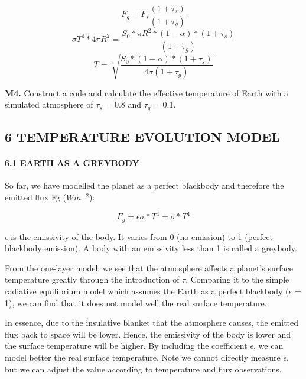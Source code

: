 \documentclass[
  letterpaper,
  DIV=11,
  numbers=noendperiod]{scrartcl}
\let\oldparagraph\paragraph
\renewcommand{\paragraph}[1]{\oldparagraph{#1}\mbox{}}
\begin{document}
\[F_g = F_s\frac{(1+\tau_s)}{(1+\tau_g)}\]
\[\sigma T^4 * 4\pi R^2 = \frac{S_0 * \pi R^2 * (1-\alpha)*(1+\tau_s)}{(1+\tau_g)}\]
\[T = \sqrt[4]{\frac{S_0 * (1-\alpha)*(1+\tau_s)}{4\sigma(1+\tau_g)}}\]

\begin{tcolorbox}[enhanced jigsaw, titlerule=0mm, title={Modelling Questions}, arc=.35mm, breakable, colback=white, toprule=.15mm, colframe=quarto-callout-caution-color-frame, opacityback=0, bottomtitle=1mm, coltitle=black, toptitle=1mm, rightrule=.15mm, colbacktitle=quarto-callout-caution-color!10!white, bottomrule=.15mm, opacitybacktitle=0.6, leftrule=.75mm, left=2mm]

\textbf{M4.} Construct a code and calculate the effective temperature of
Earth with a simulated atmosphere of \(\tau_s\) = 0.8 and \(\tau_g\) =
0.1.

\end{tcolorbox}

\hypertarget{temperature-evolution-model}{%
\subsection{6 \textbar{} TEMPERATURE EVOLUTION
MODEL}\label{temperature-evolution-model}}

\hypertarget{earth-as-a-greybody}{%
\paragraph{6.1 EARTH AS A GREYBODY}\label{earth-as-a-greybody}}

So far, we have modelled the planet as a perfect blackbody and therefore
the emitted flux Fg (\(W m^{-2}\)):

\begin{equation}
F_{g} = \epsilon\sigma * T^4 = \sigma * T^4
\end{equation}

\(\epsilon\) is the emissivity of the body. It varies from 0 (no
emission) to 1 (perfect blackbody emission). A body with an emissivity
less than 1 is called a greybody.

From the one-layer model, we see that the atmosphere affects a planet's
surface temperature greatly through the introduction of \(\tau\).
Comparing it to the simple radiative equilibrium model which assumes the
Earth as a perfect blackbody (\(\epsilon\) = 1), we can find that it
does not model well the real surface temperature.

In essence, due to the insulative blanket that the atmosphere causes,
the emitted flux back to space will be lower. Hence, the emissivity of
the body is lower and the surface temperature will be higher. By
including the coefficient \(\epsilon\), we can model better the real
surface temperature. Note we cannot directly measure \(\epsilon\), but
we can adjust the value according to temperature and flux observations.
\end{document}
